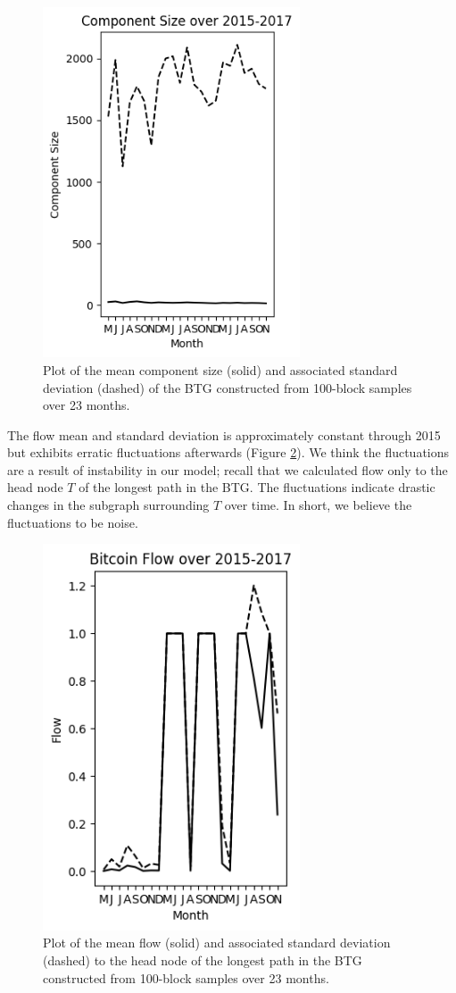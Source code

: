 \documentclass[letterpaper, 10 pt, conference]{ieeeconf}  %
\begin{document}
\begin{figure}
\centering
\includegraphics[width=3in]{Plots/Time/comp.png}
\caption{\label{comp} Plot of the mean component size (solid) and associated standard deviation (dashed) of the BTG constructed from 100-block samples over 23 months.}
\end{figure}

The flow mean and standard deviation is approximately constant through 2015 but exhibits erratic fluctuations afterwards (Figure \ref{flow}). We think the fluctuations are a result of instability in our model; recall that we calculated flow only to the head node $T$ of the longest path in the BTG. The fluctuations indicate drastic changes in the subgraph surrounding $T$ over time. In short, we believe the fluctuations to be noise.

\begin{figure}
\centering
\includegraphics[width=3in]{Plots/Time/flow.png}
\caption{\label{flow} Plot of the mean flow (solid) and associated standard deviation (dashed) to the head node of the longest path in the BTG constructed from 100-block samples over 23 months.}
\end{figure}
\end{document}
